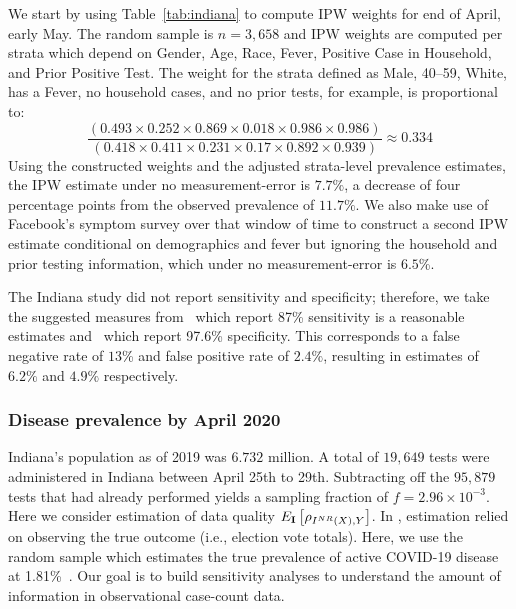 \documentclass[11pt]{amsart}
\numberwithin{equation}{section}
\theoremstyle{plain}
\def\I{\bf I}
\begin{document}
 We start by using Table~\ref{tab:indiana} to compute IPW weights for end of April, early May.  The random sample is $n=3,658$ and IPW weights are computed per strata which depend on Gender, Age, Race, Fever, Positive Case in Household, and Prior Positive Test.  The weight for the strata defined as Male, 40--59, White, has a Fever, no household cases, and no prior tests, for example, is proportional to:
 $$
 \frac{\left( 0.493 \times 0.252 \times 0.869 \times 0.018 \times 0.986 \times 0.986 \right)}{\left(0.418 \times 0.411 \times 0.231 \times 0.17 \times 0.892 \times 0.939 \right)} \approx 0.334
 $$
 Using the constructed weights and the adjusted strata-level prevalence estimates, the IPW estimate under no measurement-error is $7.7\%$, a decrease of four percentage points from the observed prevalence of $11.7\%$. We also make use of Facebook's symptom survey over that window of time to construct a second IPW estimate conditional on demographics and fever but ignoring the household and prior testing information, which under no measurement-error is $6.5$\%.

 The Indiana study did not report sensitivity and specificity; therefore, we take the suggested measures from~\cite{Arevalo2020} which report 87\% sensitivity is a reasonable estimates and~\cite{Cohen2020} which report 97.6\% specificity.  This corresponds to a false negative rate of $13$\% and false positive rate of $2.4\%$, resulting in estimates of $6.2\%$ and $4.9\%$ respectively.

 \subsubsection{Disease prevalence by April 2020}

 Indiana's population as of 2019 was $6.732$ million.  A total of $19,649$ tests were administered in Indiana between April 25th to 29th. Subtracting off the $95,879$ tests that had already performed yields a sampling fraction of $f = 2.96 \times 10^{-3}$. Here we consider estimation of data quality $E_{\I} \left[ \rho_{I^{NR} (X),Y} \right]$. In \cite{Meng2018}, estimation relied on observing the true outcome (i.e., election vote totals). Here, we use the random sample which estimates the true prevalence of active COVID-19 disease at 1.81\%~\cite{Yiannoutsos2021}.  Our goal is to build sensitivity analyses to understand the amount of information in observational case-count data.
\end{document}

